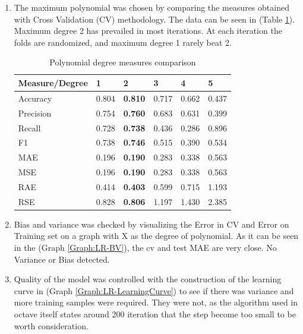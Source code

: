 \documentclass{article}
\begin{document}
\begin{enumerate}  
\item The maximum polynomial was chosen by comparing the measures obtained with Cross Validation (CV) methodology. The data can be seen in (Table
\ref{tab:LR-Measures}). Maximum degree 2 has prevailed in most iterations. At each iteration the folds are randomized, and maximum degree 1 rarely beat 2. 

\begin{table}[]
\centering
\caption{Polynomial degree measures comparison}
\label{tab:LR-Measures}
\begin{tabular}{|l|l|l|l|l|l|}
\hline
Measure/Degree  & 1     & \textbf{2}     & 3     & 4     & 5     \\ \hline
Accuracy  		& 0.804 & \textbf{0.810} & 0.717 & 0.662 & 0.437 \\ \hline
Precision		& 0.754 & \textbf{0.760} & 0.683 & 0.631 & 0.399 \\ \hline
Recall    		& 0.728 & \textbf{0.738} & 0.436 & 0.286 & 0.896 \\ \hline
F1        		& 0.738 & \textbf{0.746} & 0.515 & 0.390 & 0.534 \\ \hline
MAE       		& 0.196 & \textbf{0.190} & 0.283 & 0.338 & 0.563 \\ \hline
MSE       		& 0.196 & \textbf{0.190} & 0.283 & 0.338 & 0.563 \\ \hline
RAE       		& 0.414 & \textbf{0.403} & 0.599 & 0.715 & 1.193 \\ \hline
RSE       		& 0.828 & \textbf{0.806} & 1.197 & 1.430 & 2.385 \\ \hline
\end{tabular}
\end{table}

\item Bias and variance was checked by visualizing the Error in CV and Error on Training set on a graph with X as the degree of polynomial. As it can be seen in the (Graph \ref{Graph:LR-BV}), the cv and test MAE are very close. No Variance or Bias detected. 


\item Quality of the model was controlled with the construction of the learning curve in (Graph \ref{Graph:LR-LearningCurve}) to see if there was variance and more training samples were required. They were not, as the algorithm used in octave itself states around 200 iteration that the step become too small to be worth consideration.
\end{enumerate}
\end{document}
